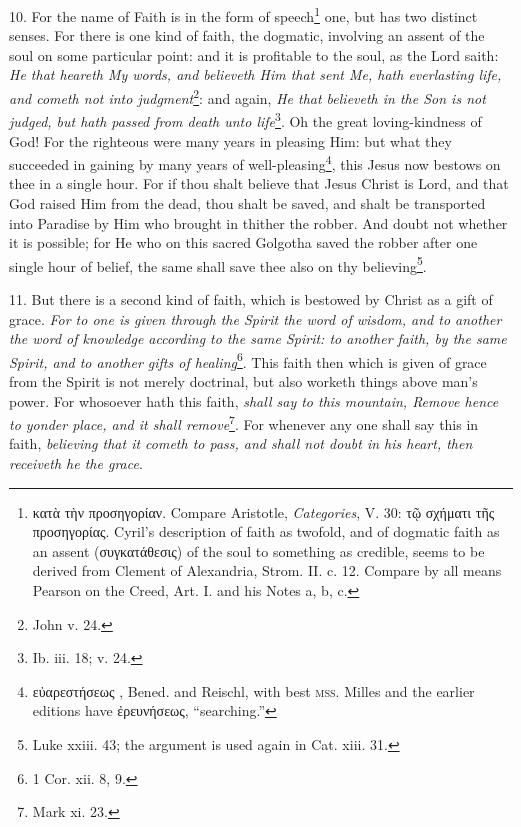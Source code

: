 10. For the name of Faith is in the form of speech\footnote{\textgreek{κατὰ τὴν προσηγορίαν}. Compare Aristotle, \emph{Categories}, V. 30: \textgreek{τῷ σχήματι τῆς προσηγορίας}. Cyril’s description of faith as twofold, and of dogmatic faith as an assent (\textgreek{συγκατάθεσις}) of the soul to something as credible, seems to be derived from Clement of Alexandria, Strom. II. c. 12. Compare by all means Pearson on the Creed, Art. I. and his Notes a, b, c.} one, but has two distinct senses. For there is one kind of faith, the dogmatic, involving an assent of the soul on some particular point: and it is profitable to the soul, as the Lord saith: \emph{He that heareth My words, and believeth Him that sent Me, hath everlasting life, and cometh not into judgment}\footnote{John v. 24.}: and again, \emph{He that believeth in the Son is not judged, but hath passed from death unto life}\footnote{Ib. iii. 18; v. 24.}. Oh the great loving-kindness of God! For the righteous were many years in pleasing Him: but what they succeeded in gaining by many years of well-pleasing\footnote{\textgreek{εὐαρεστήσεως} , Bened. and Reischl, with best \textsc{mss.} Milles and the earlier editions have \textgreek{ἐρευνήσεως}, “searching.”}, this Jesus now bestows on thee in a single hour. For if thou shalt believe that Jesus Christ is Lord, and that God raised Him from the dead, thou shalt be saved, and shalt be transported into Paradise by Him who brought in thither the robber. And doubt not whether it is possible; for He who on this sacred Golgotha saved the robber after one single hour of belief, the same shall save thee also on thy believing\footnote{Luke xxiii. 43; the argument is used again in Cat. xiii. 31.}.

11. But there is a second kind of faith, which is bestowed by Christ as a gift of grace. \emph{For to one is given through the Spirit the word of wisdom, and to another the word of knowledge according to the same Spirit: to another faith, by the same Spirit, and to another gifts of healing}\footnote{1 Cor. xii. 8, 9.}. This faith then which is given of grace from the Spirit is not merely doctrinal, but also worketh things above man’s power. For whosoever hath this faith, \emph{shall say to this mountain, Remove hence to yonder place, and it shall remove}\footnote{Mark xi. 23.}. For whenever any one shall say this in faith, \emph{believing that it cometh to pass, and shall not doubt in his heart, then receiveth he the grace}.

